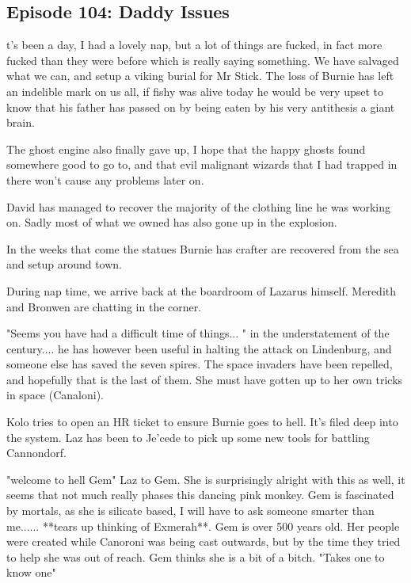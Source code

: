 \subsection{Episode 104: Daddy Issues}

t's been a day, I had a lovely nap, but a lot of things are fucked, in fact more fucked than they were before which is really saying something. We have salvaged what we can, and setup a viking burial for Mr Stick. The loss of Burnie has left an indelible mark on us all, if fishy was alive today he would be very upset to know that his father has passed on by being eaten by his very antithesis a giant brain.\medskip

The ghost engine also finally gave up, I hope that the happy ghosts found somewhere good to go to, and that evil malignant wizards that I had trapped in there won't cause any problems later on.\medskip

David has managed to recover the majority of the clothing line he was working on. Sadly most of what we owned has also gone up in the explosion.\medskip

In the weeks that come the statues Burnie has crafter are recovered from the sea and setup around town.\medskip

During nap time, we arrive back at the boardroom of Lazarus himself. Meredith and Bronwen are chatting in the corner.\medskip

"Seems you have had a difficult time of things... " in the understatement of the century.... he has however been useful in halting the attack on Lindenburg, and someone else has saved the seven spires. The space invaders have been repelled, and hopefully that is the last of them. She must have gotten up to her own tricks in space (Canaloni).\medskip

Kolo tries to open an HR ticket to ensure Burnie goes to hell. It's filed deep into the system. Laz has been to Je'cede to pick up some new tools for battling Cannondorf.\medskip

"welcome to hell Gem" Laz to Gem. She is surprisingly alright with this as well, it seems that not much really phases this dancing pink monkey. Gem is fascinated by mortals, as she is silicate based, I will have to ask someone smarter than me...... **tears up thinking of Exmerah**. Gem is over 500 years old. Her people were created while Canoroni was being cast outwards, but by the time they tried to help she was out of reach. Gem thinks she is a bit of a bitch. "Takes one to know one"\medskip

